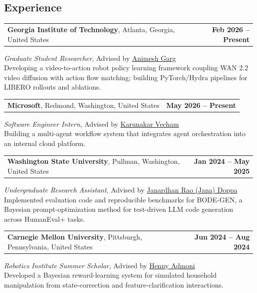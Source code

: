 \documentclass[margin,line]{res}
\begin{document}
\begin{resume}

\section{\sc Experience}

\begin{tabularx}{\textwidth}{@{}X r@{}}
\textbf{Georgia Institute of Technology}, Atlanta, Georgia, United States & \textbf{Feb 2026 -- Present} \\
\end{tabularx}
\emph{Graduate Student Researcher}, Advised by \href{https://animesh.garg.tech/}{\textcolor{cvblue}{Animesh Garg}} \\
Developing a video-to-action robot policy learning framework coupling WAN 2.2 video diffusion with action flow matching; building PyTorch/Hydra pipelines for LIBERO rollouts and ablations.

\begin{tabularx}{\textwidth}{@{}X r@{}}
\textbf{Microsoft}, Redmond, Washington, United States & \textbf{May 2026 -- Present} \\
\end{tabularx}
\emph{Software Engineer Intern}, Advised by \href{https://www.linkedin.com/in/vechamk/}{\textcolor{cvblue}{Karunakar Vecham}} \\
Building a multi-agent workflow system that integrates agent orchestration into an internal cloud platform.

\begin{tabularx}{\textwidth}{@{}X r@{}}
\textbf{Washington State University}, Pullman, Washington, United States & \textbf{Jan 2024 -- May 2025} \\
\end{tabularx}
\emph{Undergraduate Research Assistant}, Advised by \href{https://eecs.wsu.edu/~jana/}{\textcolor{cvblue}{Janardhan Rao (Jana) Doppa}} \\
Implemented evaluation code and reproducible benchmarks for BODE-GEN, a Bayesian prompt-optimization method for test-driven LLM code generation across HumanEval+ tasks.

\begin{tabularx}{\textwidth}{@{}X r@{}}
\textbf{Carnegie Mellon University}, Pittsburgh, Pennsylvania, United States & \textbf{Jun 2024 -- Aug 2024} \\
\end{tabularx}
\emph{Robotics Institute Summer Scholar}, Advised by \href{https://hennyadmoni.com/}{\textcolor{cvblue}{Henny Admoni}} \\
Developed a Bayesian reward-learning system for simulated household manipulation from state-correction and feature-clarification interactions.


\end{resume}
\end{document}
